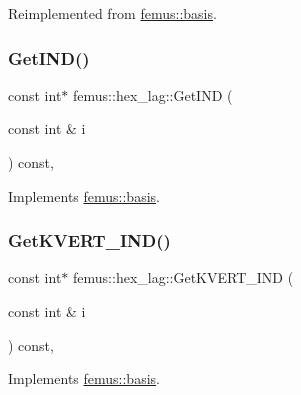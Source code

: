 Reimplemented from \mbox{\hyperlink{classfemus_1_1basis_a2ba867dcfa634c47f1c52caddd9bfdba}{femus\+::basis}}.

\mbox{\label{classfemus_1_1hex__lag_ae7c005d638cb17f079302b216114e16e}} 
\subsubsection{\texorpdfstring{Get\+I\+N\+D()}{GetIND()}}
{\footnotesize\ttfamily const int$\ast$ femus\+::hex\+\_\+lag\+::\+Get\+I\+ND (\begin{DoxyParamCaption}\item[{const int \&}]{i }\end{DoxyParamCaption}) const\hspace{0.3cm}{\ttfamily [inline]}, {\ttfamily [virtual]}}



Implements \mbox{\hyperlink{classfemus_1_1basis_a3f63ad97ce70cd4a1196ede69f1f144b}{femus\+::basis}}.

\mbox{\label{classfemus_1_1hex__lag_a86a146b7f3f4b8af3b41f86f028e0ac2}} 
\subsubsection{\texorpdfstring{Get\+K\+V\+E\+R\+T\+\_\+\+I\+N\+D()}{GetKVERT\_IND()}}
{\footnotesize\ttfamily const int$\ast$ femus\+::hex\+\_\+lag\+::\+Get\+K\+V\+E\+R\+T\+\_\+\+I\+ND (\begin{DoxyParamCaption}\item[{const int \&}]{i }\end{DoxyParamCaption}) const\hspace{0.3cm}{\ttfamily [inline]}, {\ttfamily [virtual]}}



Implements \mbox{\hyperlink{classfemus_1_1basis_a95ceb3feae4c484b0baa6a4d35d38909}{femus\+::basis}}.

\mbox{\label{classfemus_1_1hex__lag_a1cd01fd5ad9c4c92deaf67e68b9d5a9b}} 
